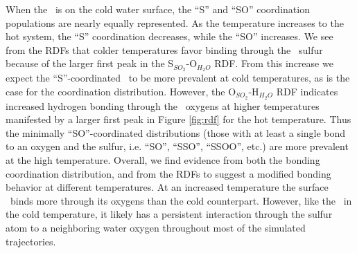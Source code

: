 When the \suldiox~is on the cold water surface, the ``S'' and ``SO'' coordination populations are nearly equally represented. As the temperature increases to the hot system, the ``S'' coordination decreases, while the ``SO'' increases. We see from the RDFs that colder temperatures favor binding through the \suldiox~sulfur because of the larger first peak in the S$_{SO_2}$-O$_{H_2O}$ RDF. From this increase we expect the ``S''-coordinated \suldiox~to be more prevalent at cold temperatures, as is the case for the coordination distribution. However, the O$_{SO_2}$-H$_{H_2O}$ RDF indicates increased hydrogen bonding through the \suldiox~oxygens at higher temperatures manifested by a larger first peak in Figure \ref{fig:rdf} for the hot temperature. Thus the minimally ``SO''-coordinated distributions (those with at least a single bond to an oxygen and the sulfur, i.e. ``SO'', ``SSO'', ``SSOO'', etc.) are more prevalent at the high temperature. Overall, we find evidence from both the bonding coordination distribution, and from the RDFs to suggest a modified bonding behavior at different temperatures. At an increased temperature the surface \suldiox~binds more through its oxygens than the cold counterpart. However, like the \suldiox~in the cold temperature, it likely has a persistent interaction through the sulfur atom to a neighboring water oxygen throughout most of the simulated trajectories.

